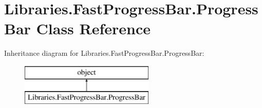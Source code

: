 \hypertarget{class_libraries_1_1_fast_progress_bar_1_1_progress_bar}{}\section{Libraries.\+Fast\+Progress\+Bar.\+Progress\+Bar Class Reference}
\label{class_libraries_1_1_fast_progress_bar_1_1_progress_bar}
Inheritance diagram for Libraries.\+Fast\+Progress\+Bar.\+Progress\+Bar\+:\begin{figure}[H]
\begin{center}
\leavevmode
\includegraphics[height=2.000000cm]{class_libraries_1_1_fast_progress_bar_1_1_progress_bar}
\end{center}
\end{figure}
